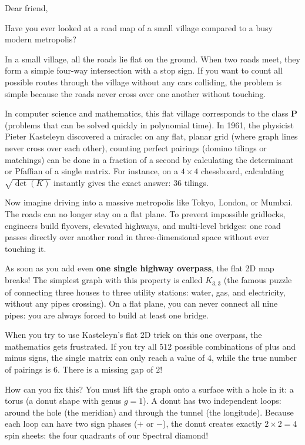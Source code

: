\documentclass[11pt,a4paper]{article}
\theoremstyle{definition}
\begin{document}
Dear friend,

Have you ever looked at a road map of a small village compared to a busy modern metropolis?

In a small village, all the roads lie flat on the ground. When two roads meet, they form a simple four-way intersection with a stop sign. If you want to count all possible routes through the village without any cars colliding, the problem is simple because the roads never cross over one another without touching.

In computer science and mathematics, this flat village corresponds to the class \textbf{P} (problems that can be solved quickly in polynomial time). In 1961, the physicist Pieter Kasteleyn discovered a miracle: on any flat, planar grid (where graph lines never cross over each other), counting perfect pairings (domino tilings or matchings) can be done in a fraction of a second by calculating the determinant or Pfaffian of a single matrix. For instance, on a $4 \times 4$ chessboard, calculating $\sqrt{\det(K)}$ instantly gives the exact answer: $36$ tilings.

Now imagine driving into a massive metropolis like Tokyo, London, or Mumbai. The roads can no longer stay on a flat plane. To prevent impossible gridlocks, engineers build flyovers, elevated highways, and multi-level bridges: one road passes directly over another road in three-dimensional space without ever touching it.

As soon as you add even \textbf{one single highway overpass}, the flat 2D map breaks! The simplest graph with this property is called $K_{3,3}$ (the famous puzzle of connecting three houses to three utility stations: water, gas, and electricity, without any pipes crossing). On a flat plane, you can never connect all nine pipes: you are always forced to build at least one bridge.

When you try to use Kasteleyn's flat 2D trick on this one overpass, the mathematics gets frustrated. If you try all $512$ possible combinations of plus and minus signs, the single matrix can only reach a value of $4$, while the true number of pairings is $6$. There is a missing gap of $2$!

How can you fix this? You must lift the graph onto a surface with a hole in it: a torus (a donut shape with genus $g = 1$). A donut has two independent loops: around the hole (the meridian) and through the tunnel (the longitude). Because each loop can have two sign phases ($+$ or $-$), the donut creates exactly $2 \times 2 = 4$ spin sheets: the four quadrants of our Spectral diamond!
\end{document}
